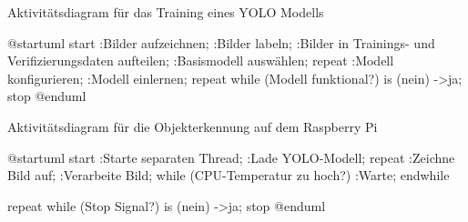 
Aktivitätsdiagram für das Training eines YOLO Modells

\begin{plantuml}    
@startuml
start
:Bilder aufzeichnen;
:Bilder labeln;
:Bilder in Trainings- und Verifizierungsdaten aufteilen;
:Basismodell auswählen;
repeat
    :Modell konfigurieren;
    :Modell einlernen;
repeat while (Modell funktional?) is (nein)
->ja;
stop
@enduml
\end{plantuml}


Aktivitätsdiagram für die Objekterkennung auf dem Raspberry Pi

\begin{plantuml}
@startuml
start
:Starte separaten Thread;
:Lade YOLO-Modell;
repeat
    :Zeichne Bild auf;
    :Verarbeite Bild;
    while (CPU-Temperatur zu hoch?)
        :Warte;
    endwhile
    
repeat while (Stop Signal?) is (nein)
->ja;
stop
@enduml
\end{plantuml}